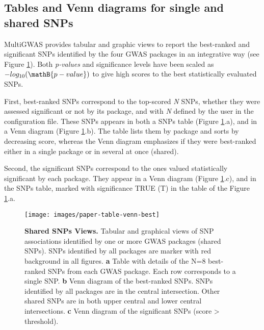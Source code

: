 \documentclass{article}
\begin{document}

\subsection{Tables and Venn diagrams for single and shared SNPs}

MultiGWAS provides tabular and graphic views to report the best-ranked and significant SNPs identified by the four GWAS packages in an integrative way (see Figure \ref{fig:Table-Shared-SNPs}). Both \emph{p-values} and significance levels have been scaled as $-log_{10}(\mathB{p-value})$ to give high scores to the best statistically evaluated SNPs.

First, best-ranked SNPs correspond to the top-scored \emph{N} SNPs, whether they were assessed significant or not by its package, and with\emph{ N} defined by the user in the configuration file. These SNPs appears in both a SNPs table (Figure \ref{fig:Table-Shared-SNPs}.a), and in a Venn diagram (Figure \ref{fig:Table-Shared-SNPs}.b). The table lists them by package and sorts by decreasing score, whereas the Venn diagram emphasizes if they were best-ranked either in a single package or in several at once (shared).

Second, the significant SNPs correspond to the ones valued statistically significant by each package. They appear in a Venn diagram (Figure \ref{fig:Table-Shared-SNPs}.c), and in the SNPs table, marked with significance TRUE (T) in the table of the Figure \ref{fig:Table-Shared-SNPs}.a.

\begin{figure}[H]
\begin{centering}
\texttt{[image: images/paper-table-venn-best]} 
\par\end{centering}
\caption{\textbf{Shared SNPs Views.} Tabular and graphical views of SNP associations identified by one or more GWAS packages (shared SNPs). SNPs identified by all packages are marker with red background in all figures. \textbf{a} Table with details of the N=8 best-ranked SNPs from each GWAS package. Each row corresponds to a single SNP. \textbf{b} Venn diagram of the best-ranked SNPs. SNPs identified by all packages are in the central intersection. Other shared SNPs are in both upper central and lower central intersections. \textbf{c} Venn diagram of the significant SNPs (score \textgreater{} threshold). \label{fig:Table-Shared-SNPs}}
\end{figure}
\end{document}
